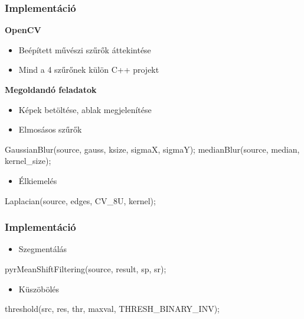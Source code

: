 \documentclass{beamer}
\begin{document}
\begin{frame}[fragile]
\frametitle{Implementáció}

\textbf{OpenCV}

\begin{itemize}
\item Beépített művészi szűrők áttekintése
\item Mind a 4 szűrőnek külön C++ projekt
\end{itemize}

\medskip

\textbf{Megoldandó feladatok}

\begin{itemize}
\item Képek betöltése, ablak megjelenítése
\item Elmosásos szűrők
\end{itemize}

\begin{cpp}
GaussianBlur(source, gauss, ksize, sigmaX, sigmaY);
medianBlur(source, median, kernel_size);
\end{cpp}

\begin{itemize}
\item Élkiemelés
\end{itemize}

\begin{cpp}
Laplacian(source, edges, CV_8U, kernel);
\end{cpp}

\end{frame}

\begin{frame}[fragile]
\frametitle{Implementáció}


\begin{itemize}
\item Szegmentálás
\end{itemize}
\begin{cpp}
pyrMeanShiftFiltering(source, result, sp, sr);
\end{cpp}

\begin{itemize}
\item Küszöbölés
\end{itemize}

\begin{cpp}
threshold(src, res, thr, maxval, THRESH_BINARY_INV);
\end{cpp}


\end{frame}
\end{document}
